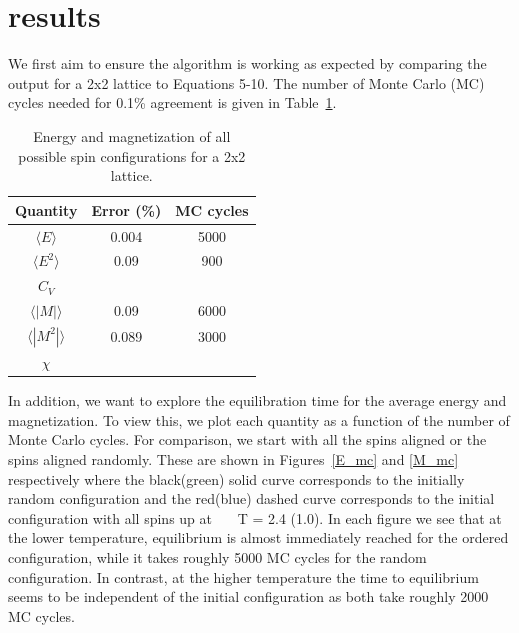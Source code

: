 \documentclass[prc,amsmath,twocolumn,superscriptaddress]{revtex4}
\begin{document}
\section{results}
\label{results}
We first aim to ensure the algorithm is working as expected by comparing the output for a 2x2 lattice to Equations 5-10. The number of Monte Carlo (MC) cycles needed for 0.1\% agreement is given in Table~\ref{cycles}.

\begin{table}[b]
\centering
\begin{tabular}{|c|c|c|}
\hline
Quantity& Error (\%) & MC cycles\\
\hline
$\langle E\rangle$&0.004 &5000 \\
$\langle E^2\rangle$&0.09 &900 \\
$C_V$ &&\\
$\langle |M|\rangle$&0.09 &6000 \\
$\langle |M^2|\rangle$&0.089 &3000 \\
$\chi$&&\\
\hline
\end{tabular}
\caption{Energy and magnetization of all possible spin configurations for a 2x2 lattice.}
\label{cycles}
\end{table}

In addition, we want to explore the equilibration time for the average energy and magnetization. To view this, we plot each quantity as a function of the number of Monte Carlo cycles. For comparison, we start with all the spins aligned or the spins aligned randomly. These are shown in Figures~\ref{E_mc} and \ref{M_mc} respectively where the black(green) solid curve corresponds to the initially random configuration and the red(blue) dashed curve corresponds to the initial configuration with all spins up  at ~~~T = 2.4 (1.0). In each figure we see that at the lower temperature, equilibrium is almost immediately reached for the ordered configuration, while it takes roughly 5000 MC cycles for the random configuration. In contrast, at the higher temperature the time to equilibrium seems to be independent of the initial configuration as both take roughly 2000 MC cycles.
\end{document}

